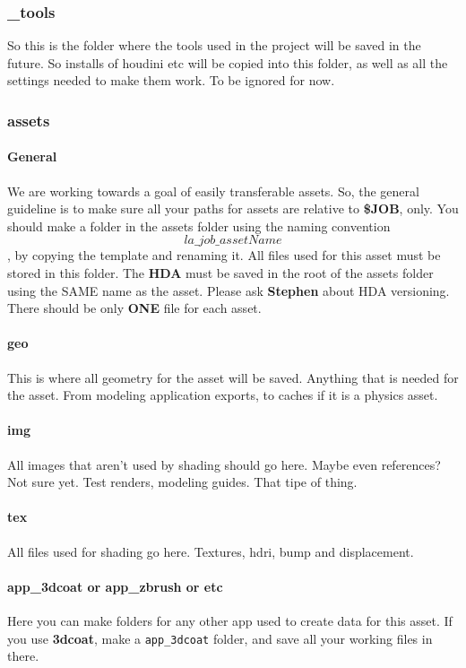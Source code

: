 \subsubsection{\_tools}
So this is the folder where the tools used in the project will be saved in the future. So installs of houdini etc will be copied into this folder, as well as all the settings needed to make them work. To be ignored for now.

\subsubsection{assets}
\paragraph{General}
We are working towards a goal of easily transferable assets. So, the general guideline is to make sure all your paths for assets are relative to \textbf{\$JOB}, only. You should make a folder in the assets folder using the naming convention \texttt{\[la\_job\_assetName\]}, by copying the template and renaming it. All files used for this asset must be stored in this folder. The \textbf{HDA} must be saved in the root of the assets folder using the SAME name as the asset. Please ask \textbf{Stephen} about HDA versioning. There should be only \textbf{ONE} file for each asset.

\paragraph{geo}
This is where all geometry for the asset will be saved. Anything that is needed for the asset. From modeling application exports, to caches if it is a physics asset. 

\paragraph{img}
All images that aren't used by shading should go here. Maybe even references? Not sure yet. Test renders, modeling guides. That tipe of thing.

\paragraph{tex}
All files used for shading go here. Textures, hdri, bump and displacement. 

\paragraph{app\_3dcoat or app\_zbrush or etc}
Here you can make folders for any other app used to create data for this asset. If you use \textbf{3dcoat}, make a \texttt{app\_3dcoat} folder, and save all your working files in there.

